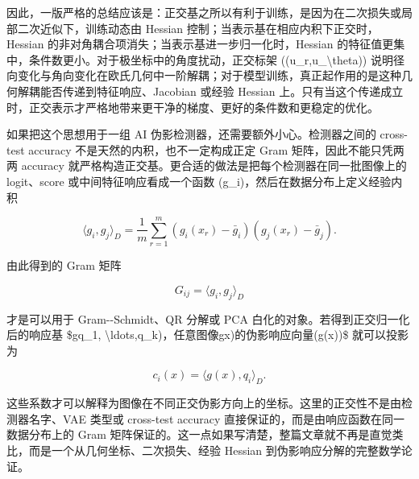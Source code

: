 因此，一版严格的总结应该是：正交基之所以有利于训练，是因为在二次损失或局部二次近似下，训练动态由 Hessian 控制；当表示基在相应内积下正交时，Hessian 的非对角耦合项消失；当表示基进一步归一化时，Hessian 的特征值更集中，条件数更小。对于极坐标中的角度扰动，正交标架 ((u\_r,u\_\textbackslash{}theta)) 说明径向变化与角向变化在欧氏几何中一阶解耦；对于模型训练，真正起作用的是这种几何解耦能否传递到特征响应、Jacobian 或经验 Hessian 上。只有当这个传递成立时，正交表示才严格地带来更干净的梯度、更好的条件数和更稳定的优化。

如果把这个思想用于一组 AI 伪影检测器，还需要额外小心。检测器之间的 cross-test accuracy 不是天然的内积，也不一定构成正定 Gram 矩阵，因此不能只凭两两 accuracy 就严格构造正交基。更合适的做法是把每个检测器在同一批图像上的 logit、score 或中间特征响应看成一个函数 (g\_i)，然后在数据分布上定义经验内积

\[
\langle g_i,g_j\rangle_D
=\frac{1}{m}\sum_{r=1}^m \left(g_i(x_r)-\bar g_i\right)\left(g_j(x_r)-\bar g_j\right).
\]

由此得到的 Gram 矩阵

\[
G_{ij}=\langle g_i,g_j\rangle_D
\]

才是可以用于 Gram-{}-Schmidt、QR 分解或 PCA 白化的对象。若得到正交归一化后的响应基 \$gq\_1,
\textbackslash{}ldots,q\_k)\(，任意图像 \)gx)\( 的伪影响应向量 \)(g(x))\$ 就可以投影为

\[
c_i(x)=\langle g(x),q_i\rangle_D.
\]

这些系数才可以解释为图像在不同正交伪影方向上的坐标。这里的正交性不是由检测器名字、VAE 类型或 cross-test accuracy 直接保证的，而是由响应函数在同一数据分布上的 Gram 矩阵保证的。这一点如果写清楚，整篇文章就不再是直觉类比，而是一个从几何坐标、二次损失、经验 Hessian 到伪影响应分解的完整数学论证。
